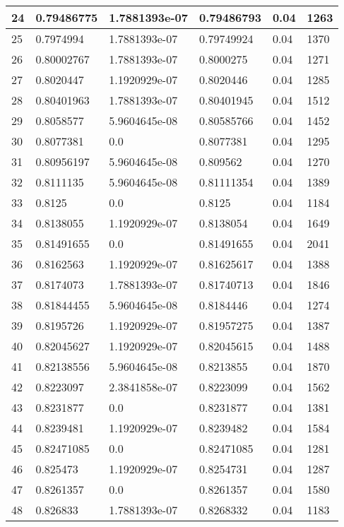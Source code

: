 \begin{longtable}{|l|l|l|l|l|l|}
24 & 0.79486775 & 1.7881393e-07 & 0.79486793 & 0.04 & 1263 \\ \hline 
25 & 0.7974994 & 1.7881393e-07 & 0.79749924 & 0.04 & 1370 \\ \hline 
26 & 0.80002767 & 1.7881393e-07 & 0.8000275 & 0.04 & 1271 \\ \hline 
27 & 0.8020447 & 1.1920929e-07 & 0.8020446 & 0.04 & 1285 \\ \hline 
28 & 0.80401963 & 1.7881393e-07 & 0.80401945 & 0.04 & 1512 \\ \hline 
29 & 0.8058577 & 5.9604645e-08 & 0.80585766 & 0.04 & 1452 \\ \hline 
30 & 0.8077381 & 0.0 & 0.8077381 & 0.04 & 1295 \\ \hline 
31 & 0.80956197 & 5.9604645e-08 & 0.809562 & 0.04 & 1270 \\ \hline 
32 & 0.8111135 & 5.9604645e-08 & 0.81111354 & 0.04 & 1389 \\ \hline 
33 & 0.8125 & 0.0 & 0.8125 & 0.04 & 1184 \\ \hline 
34 & 0.8138055 & 1.1920929e-07 & 0.8138054 & 0.04 & 1649 \\ \hline 
35 & 0.81491655 & 0.0 & 0.81491655 & 0.04 & 2041 \\ \hline 
36 & 0.8162563 & 1.1920929e-07 & 0.81625617 & 0.04 & 1388 \\ \hline 
37 & 0.8174073 & 1.7881393e-07 & 0.81740713 & 0.04 & 1846 \\ \hline 
38 & 0.81844455 & 5.9604645e-08 & 0.8184446 & 0.04 & 1274 \\ \hline 
39 & 0.8195726 & 1.1920929e-07 & 0.81957275 & 0.04 & 1387 \\ \hline 
40 & 0.82045627 & 1.1920929e-07 & 0.82045615 & 0.04 & 1488 \\ \hline 
41 & 0.82138556 & 5.9604645e-08 & 0.8213855 & 0.04 & 1870 \\ \hline 
42 & 0.8223097 & 2.3841858e-07 & 0.8223099 & 0.04 & 1562 \\ \hline 
43 & 0.8231877 & 0.0 & 0.8231877 & 0.04 & 1381 \\ \hline 
44 & 0.8239481 & 1.1920929e-07 & 0.8239482 & 0.04 & 1584 \\ \hline 
45 & 0.82471085 & 0.0 & 0.82471085 & 0.04 & 1281 \\ \hline 
46 & 0.825473 & 1.1920929e-07 & 0.8254731 & 0.04 & 1287 \\ \hline 
47 & 0.8261357 & 0.0 & 0.8261357 & 0.04 & 1580 \\ \hline 
48 & 0.826833 & 1.7881393e-07 & 0.8268332 & 0.04 & 1183 \\ \hline 

\end{longtable}
